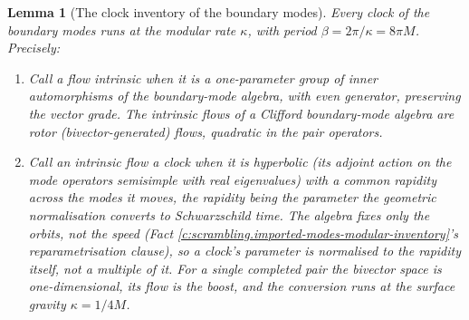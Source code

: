 \documentclass[11pt]{article}
\newtheorem{lemma}[theorem]{Lemma}
\theoremstyle{definition}
\theoremstyle{plain}
\newcommand{\changedmark}[2]{\marginpar{\raggedright\scriptsize\color{#1}#2}}
\begin{document}
\begin{lemma}[The clock inventory of the boundary modes]\label{c:scrambling.clock-inventory-boundary-modes}
\changedmark{gray}{reworded}
Every clock of the boundary modes runs at the modular rate $\kappa$, with period $\beta = 2\pi/\kappa = 8\pi M$. Precisely:
\begin{enumerate}
\renewcommand{\labelenumi}{(\roman{enumi})}
\item Call a flow \emph{intrinsic} when it is a one-parameter group of inner automorphisms of the boundary-mode algebra, with even generator, preserving the vector grade. The intrinsic flows of a Clifford boundary-mode algebra are rotor (bivector-generated) flows, quadratic in the pair operators.
\item Call an intrinsic flow a \emph{clock} when it is hyperbolic (its adjoint action on the mode operators semisimple with real eigenvalues) with a common rapidity across the modes it moves, the rapidity being the parameter the geometric normalisation converts to Schwarzschild time. The algebra fixes only the orbits, not the speed (Fact \ref{c:scrambling.imported-modes-modular-inventory}'s reparametrisation clause), so a clock's parameter is normalised to the rapidity itself, not a multiple of it. For a single completed pair the bivector space is one-dimensional, its flow is the boost, and the conversion runs at the surface gravity $\kappa = 1/4M$.

\end{enumerate}
\end{lemma}
\end{document}

